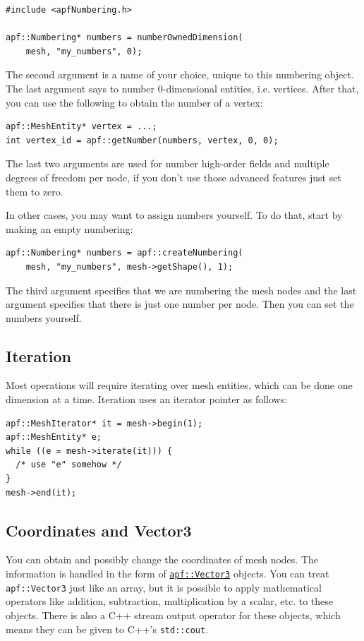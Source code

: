 \documentclass{article}
\begin{document}
\begin{lstlisting}
#include <apfNumbering.h>

apf::Numbering* numbers = numberOwnedDimension(
    mesh, "my_numbers", 0);
\end{lstlisting}

The second argument is a name of your choice, unique to this numbering object.
The last argument says to number 0-dimensional entities, i.e. vertices.
After that, you can use the following to obtain the number of a
vertex:

\begin{lstlisting}
apf::MeshEntity* vertex = ...;
int vertex_id = apf::getNumber(numbers, vertex, 0, 0);
\end{lstlisting}

The last two arguments are used for number high-order fields and
multiple degrees of freedom per node, if you don't use those
advanced features just set them to zero.

In other cases, you may want to assign numbers yourself.
To do that, start by making an empty numbering:

\begin{lstlisting}
apf::Numbering* numbers = apf::createNumbering(
    mesh, "my_numbers", mesh->getShape(), 1);
\end{lstlisting}

The third argument specifies that we are numbering the mesh
nodes and the last argument specifies that there is just one
number per node.
Then you can set the numbers yourself.

\subsection{Iteration}

Most operations will require iterating over mesh entities,
which can be done one dimension at a time.
Iteration uses an iterator pointer as follows:

\begin{lstlisting}
apf::MeshIterator* it = mesh->begin(1);
apf::MeshEntity* e;
while ((e = mesh->iterate(it))) {
  /* use "e" somehow */
}
mesh->end(it);
\end{lstlisting}

\subsection{Coordinates and Vector3}

You can obtain and possibly change the coordinates of mesh nodes.
The information is handled in the form of
\href{http://scorec.rpi.edu/~dibanez/core/classapf_1_1Vector3.html#_details}{\texttt{apf::Vector3}}
objects.
You can treat \texttt{apf::Vector3} just like an array, but it is
possible to apply mathematical operators like addition, subtraction,
multiplication by a scalar, etc. to these objects.
There is also a C++ stream output operator for these objects, which
means they can be given to C++'s \texttt{std::cout}.
\end{document}
